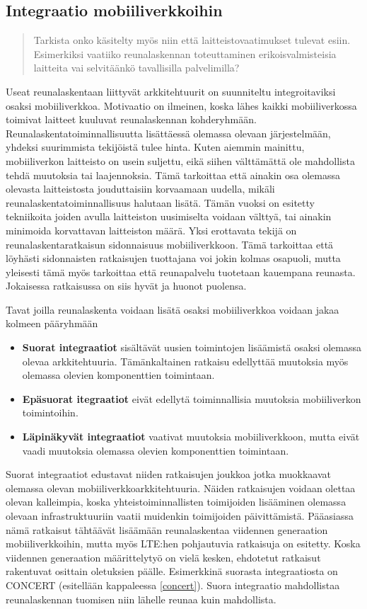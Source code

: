
\subsection{Integraatio mobiiliverkkoihin}
\begin{quote}
Tarkista onko käsitelty myös niin että laitteistovaatimukset tulevat esiin. Esimerkiksi vaatiiko reunalaskennan toteuttaminen erikoisvalmisteisia laitteita vai selvitäänkö tavallisilla palvelimilla?
\end{quote}


Useat reunalaskentaan liittyvät arkkitehtuurit on suunniteltu integroitaviksi osaksi mobiiliverkkoa.
Motivaatio on ilmeinen, koska lähes kaikki mobiiliverkossa toimivat laitteet kuuluvat reunalaskennan kohderyhmään.
Reunalaskentatoiminnallisuutta lisättäessä olemassa olevaan järjestelmään, yhdeksi suurimmista tekijöistä tulee hinta. 
Kuten aiemmin mainittu, mobiiliverkon laitteisto on usein suljettu, eikä siihen välttämättä ole mahdollista tehdä muutoksia tai laajennoksia.
Tämä tarkoittaa että ainakin osa olemassa olevasta laitteistosta jouduttaisiin korvaamaan uudella, mikäli reunalaskentatoiminnallisuus halutaan lisätä.
Tämän vuoksi on esitetty tekniikoita joiden avulla laitteiston uusimiselta voidaan välttyä, tai ainakin minimoida korvattavan laitteiston määrä.
Yksi erottavata tekijä on reunalaskentaratkaisun sidonnaisuus mobiiliverkkoon. Tämä tarkoittaa että löyhästi sidonnaisten ratkaisujen tuottajana voi jokin kolmas osapuoli, mutta yleisesti tämä myös tarkoittaa että reunapalvelu tuotetaan kauempana reunasta.
Jokaisessa ratkaisussa on siis hyvät ja huonot puolensa. 

Tavat joilla reunalaskenta voidaan lisätä osaksi mobiiliverkkoa voidaan jakaa kolmeen pääryhmään

\begin{itemize}
\item \textbf{Suorat integraatiot} sisältävät uusien toimintojen lisäämistä osaksi olemassa olevaa arkkitehtuuria. Tämänkaltainen ratkaisu edellyttää muutoksia myös olemassa olevien komponenttien toimintaan. 
\item \textbf{Epäsuorat itegraatiot} eivät edellytä toiminnallisia muutoksia mobiiliverkon toimintoihin.
\item \textbf{Läpinäkyvät integraatiot} vaativat muutoksia mobiiliverkkoon, mutta eivät vaadi muutoksia olemassa olevien komponenttien toimintaan.
\end{itemize}

Suorat integraatiot edustavat niiden ratkaisujen joukkoa jotka muokkaavat olemassa olevan mobiiliverkkoarkkitehtuuria.
Näiden ratkaisujen voidaan olettaa olevan kalleimpia, koska yhteistoiminnallisten toimijoiden lisääminen olemassa olevaan infrastruktuuriin vaatii muidenkin toimijoiden päivittämistä.
Pääasiassa nämä ratkaisut tähtäävät lisäämään reunalaskentaa viidennen generaation mobiiliverkkoihin, mutta myös LTE:hen pohjautuvia ratkaisuja on esitetty.
Koska viidennen generaation määrittelytyö on vielä kesken, ehdotetut ratkaisut rakentuvat osittain oletuksien päälle.
Esimerkkinä suorasta integraatiosta on CONCERT (esitellään kappaleessa \ref{concert}). Suora integraatio mahdollistaa reunalaskennan tuomisen niin lähelle reunaa kuin mahdollista.

